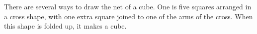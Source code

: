 There are several ways to draw the net of a cube. One is five squares arranged in
a cross shape, with one extra square joined to one of the arms of the cross. When
this shape is folded up, it makes a cube.